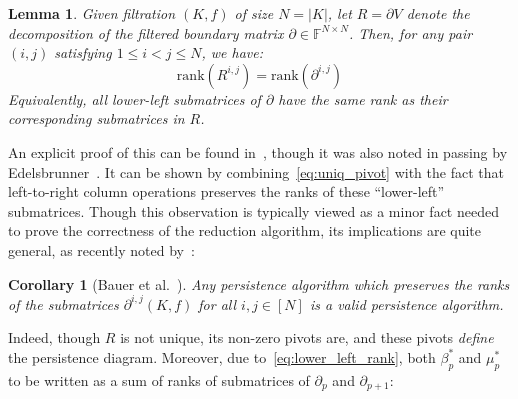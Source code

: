 \documentclass[10pt]{article}
\numberwithin{equation}{section}
\newcommand{\+}{%
	\raisebox{0.18ex}{\scaleobj{0.55}{+}}
}
\newtheorem{corollary}{Corollary}
\newtheorem{lemma}{Lemma}
\theoremstyle{definition}
\theoremstyle{definition}
\begin{document}
\begin{lemma}\label{lemma:rank}
Given filtration $(K, f)$ of size $N = \lvert K \rvert$, let $R = \partial V$ denote the decomposition of the filtered boundary matrix $\partial \in \mathbb{F}^{N \times N}$. Then, for any pair $(i,j)$ satisfying $1 \leq i < j \leq N$, we have:
	\begin{equation}\label{eq:lower_left_rank}
		\mathrm{rank}(R^{i,j}) = \mathrm{rank}(\partial^{i, j})
	\end{equation}
Equivalently, all lower-left submatrices of $\partial$ have the same rank as their corresponding submatrices in $R$.
\end{lemma} %
\noindent
An explicit proof of this can be found in~\cite{dey2022computational}, though it was also noted in passing by Edelsbrunner~\cite{edelsbrunner2000topological}. It can be shown by combining~\eqref{eq:uniq_pivot} with the fact that left-to-right column operations preserves the ranks of these ``lower-left'' submatrices.
Though this observation is typically viewed as a minor fact needed to prove the correctness of the reduction algorithm, its implications are quite general, as recently noted by~\cite{bauer2022keeping}:
\begin{corollary}[Bauer et al.~\cite{bauer2022keeping}]
	Any persistence algorithm which preserves the ranks of the submatrices $\partial^{i,j}(K, f)$ for all $i,j \in [N]$ is a valid persistence algorithm. 
\end{corollary}
\noindent Indeed, though $R$ is not unique, its non-zero pivots are, and these pivots \emph{define} the persistence diagram. Moreover, due to~\eqref{eq:lower_left_rank}, both $\beta_p^{\ast}$ and $\mu_p^{\ast}$ to be written as a sum of ranks of submatrices of $\partial_p$ and $\partial_{p+1}$:
\end{document}
